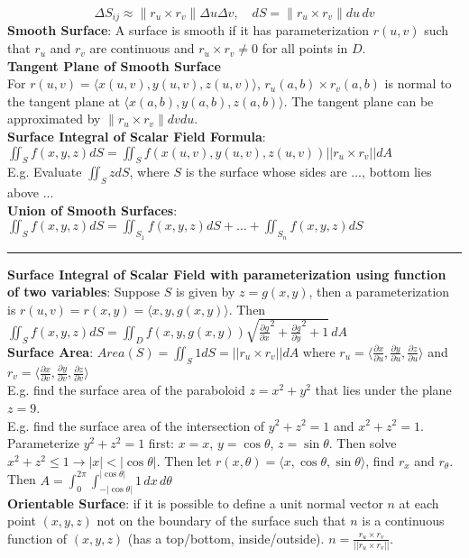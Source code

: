 \documentclass{article}
\begin{document}
{\begin{multicols*}{3}
$$\Delta S_{ij}\approx \parallel r_u\times r_v\parallel \Delta u\Delta v, \quad dS=\parallel r_u\times r_v\parallel du\,dv$$
\textbf{Smooth Surface}: A surface is smooth if it has parameterization $r(u,v)$ such that $r_u$ and $r_v$ are continuous and $r_u\times r_v\not=0$ for all points in $D$. \\
\textbf{Tangent Plane of Smooth Surface}\\
For $r(u,v)=\langle x(u,v),y(u,v),z(u,v)\rangle$, $r_u(a,b)\times r_v(a,b)$ is normal to the tangent plane at $\langle x(a,b),y(a,b),z(a,b)\rangle$. The tangent plane can be approximated by $\parallel r_u\times r_v\parallel dv du$. \\
\textbf{Surface Integral of Scalar Field Formula}: $\iint_S f(x,y,z)dS=\iint_Sf(x(u,v),y(u,v),z(u,v))||r_u\times r_v||dA$\\
E.g. Evaluate $\iint_S zdS$, where $S$ is the surface whose sides are ..., bottom lies above ...\\
\textbf{Union of Smooth Surfaces}: $\iint_Sf(x,y,z)dS=\iint_{S_1}f(x,y,z)dS+\dots+\iint_{S_n}f(x,y,z)dS$\\
\rule{193pt}{0.2pt}
\textbf{Surface Integral of Scalar Field with parameterization using function of two variables}: Suppose $S$ is given by $z=g(x,y)$, then a parameterization is $r(u,v)=r(x,y)=\langle x,y,g(x,y)\rangle$. Then $\iint_Sf(x,y,z)dS=\iint_D f(x,y,g(x,y))\sqrt{\frac{\partial g}{\partial x}^2+\frac{\partial g}{\partial y}^2+1}\,dA$ \\
\textbf{Surface Area}: $Area(S)=\iint_S1dS=||r_u\times r_v||dA$ where $r_u=\langle \frac{\partial x}{\partial u},\frac{\partial y}{\partial u},\frac{\partial z}{\partial u}\rangle$ and $r_v=\langle \frac{\partial x}{\partial v},\frac{\partial y}{\partial v},\frac{\partial z}{\partial v}\rangle$\\
E.g. find the surface area of the paraboloid $z=x^2+y^2$ that lies under the plane $z=9$. \\
E.g. find the surface area of the intersection of $y^2+z^2=1$ and $x^2+z^2=1$. Parameterize $y^2+z^2=1$ first: $x=x$, $y=\cos\theta$, $z=\sin\theta$. Then solve $x^2+z^2\leq 1\to |x|<|\cos\theta|$. Then let $r(x,\theta)=\langle x, \cos\theta,\sin\theta\rangle$, find $r_x$ and $r_\theta$. Then $A=\int_0^{2\pi}\int_{-|\cos\theta|}^{|\cos\theta|}1\,dx\,d\theta$ \\
\textbf{Orientable Surface}: if it is possible to define a unit normal vector $n$ at each point $(x,y,z)$ not on the boundary of the surface such that $n$ is a continuous function of $(x,y,z)$ (has a top/bottom, inside/outside). $n=\frac{r_u\times r_v}{||r_u\times r_v||}$. \\

\end{multicols*}}
\end{document}
